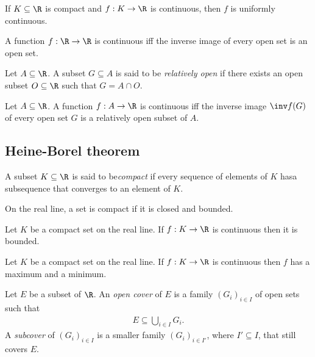 \documentclass{article}
\begin{document}
\begin{proposition}[2.23]
	If $K\subseteq\R$ is compact and $f:K\to\R$ is continuous, then $f$ is
	uniformly continuous.
\end{proposition}

\begin{proposition}[2.24]
	A function $f:\R\to\R$ is continuous iff the inverse image of every
	open set is an open set.
\end{proposition}

\begin{definition}
	Let $A\subseteq\R$. A subset $G\subseteq A$ is said to be \emph{relatively open}
	if there exists an open subset $O\subseteq\R$ such that $G=A\cap O$.
\end{definition}

\begin{theorem}
	Let $A\subseteq\R$. A function $f:A\to\R$ is continuous iff the inverse
	image $\inv f(G)$ of every open set $G$ is a relatively open subset of $A$.
\end{theorem}

\subsection{Heine-Borel theorem}

\begin{definition}
	A subset $K\subseteq\R$ is said to be\emph{compact} if every sequence of elements
	of $K$ hasa subsequence that converges to an element of $K$.
\end{definition}

\begin{theorem}[2.15]
	On the real line, a set is compact if it is closed and bounded.
\end{theorem}

\begin{theorem}[2.17]
	Let $K$ be a compact set on the real line. If $f:K\to\R$ is continuous
	then it is bounded.
\end{theorem}

\begin{theorem}
	Let $K$ be a compact set on the real line. If $f:K\to\R$ is continuous
	then $f$ has a maximum and a minimum.
\end{theorem}

\begin{definition}
	Let $E$ be a subset of $\R$. An \emph{open cover} of $E$ is a family
	$(G_i)_{i\in I}$ of open sets such that
	\begin{align*}
		E\subseteq \bigcup_{i\in I}G_i.
	\end{align*}
	A \emph{subcover} of $(G_i)_{i\in I}$ is a smaller family $(G_i)_{i\in I'}$,
	where $I'\subseteq I$, that still covers $E$.
\end{definition}
\end{document}
